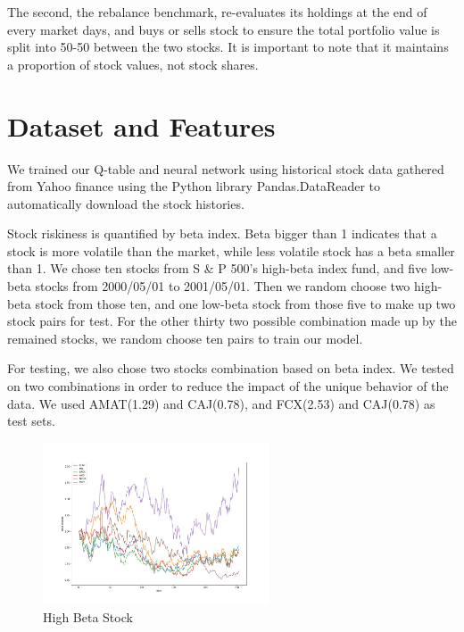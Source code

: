 The second, the rebalance benchmark, re-evaluates its holdings at the end of every market days, and buys or sells stock to ensure the total portfolio value is split into 50-50 between the two stocks. It is important to note that it maintains a proportion of stock values, not stock shares.

\section{Dataset and Features}
We trained our Q-table and neural network using historical stock data gathered from Yahoo finance using the Python library Pandas.DataReader to automatically download the stock histories. 

Stock riskiness is quantified by beta index. Beta bigger than 1 indicates that a stock is more volatile than the market, while less volatile stock has a beta smaller than 1. We chose ten stocks from S \& P 500’s high-beta index fund, and five low-beta stocks from 2000/05/01 to 2001/05/01. Then we random choose two high-beta stock from those ten, and one low-beta stock from those five to make up two stock pairs for test. For the other thirty two possible combination made up by the remained stocks, we random choose ten pairs to train our model. 

For testing, we also chose two stocks combination based on beta index. We tested on two combinations in order to reduce the impact of the unique behavior of the data. We used AMAT(1.29) and CAJ(0.78), and FCX(2.53) and CAJ(0.78) as test sets. 

\begin{figure}[h]
\begin{center}
\includegraphics[clip, width=0.6\textwidth]{Graphics/highbeta_pricechange.jpg} \caption{High Beta Stock}
\end{center}
\end{figure}

